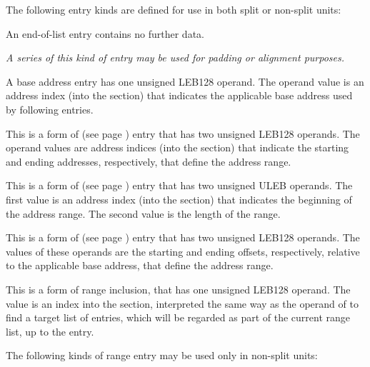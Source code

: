 The following entry kinds are defined for use in both
split or non-split units:
\begin{enumerate}[1. ]
\itembfnl{\DWRLEendoflistTARG}
An end-of-list entry contains no further data.

\textit{A series of this kind of entry may be used for padding or
alignment purposes.}
      
\itembfnl{\DWRLEbaseaddressxTARG}
A base address entry has one unsigned LEB128 operand.
The operand value is an address index (into the \dotdebugaddr{} 
section) that indicates the applicable base address used by 
following \DWRLEoffsetpair{} entries.
    
\itembfnl{\DWRLEstartxendxTARG}
This is a form of  
\bb
(see page \pageref{text:bndrng})
\eb
entry that has two unsigned LEB128 operands. The operand values are
address indices (into the \dotdebugaddr{} section) that indicate the
starting and ending addresses, respectively, that define
the address range.

\itembfnl{\DWRLEstartxlengthTARG}
This is a form of  
\bb
(see page \pageref{text:bndrng})
\eb
entry that has two unsigned ULEB operands. The first value is an address index
(into the \dotdebugaddr{} section) that indicates the beginning of 
the address range. The second value is the length of the range.
       
\itembfnl{\DWRLEoffsetpairTARG}
This is a form of  
\bb
(see page \pageref{text:bndrng})
\eb
entry that has two unsigned LEB128 operands. The values of these
operands are the starting and ending offsets, respectively,
relative to the applicable base address, that define the
address range.

\bb
\itembfnl{\DWRLEincludernglistxTARG}
This is a form of range inclusion, that has one unsigned LEB128
operand.  The value is an index into the \dotdebugrnglists{} section,
interpreted the same way as the operand of \DWFORMrnglistx{} to find
a target list of entries, which will be regarded as part of the
current range list, up to the \DWRLEendoflist{} entry.
\eb

\end{enumerate} 

The following kinds of range entry may be used only in non-split 
units:
 
